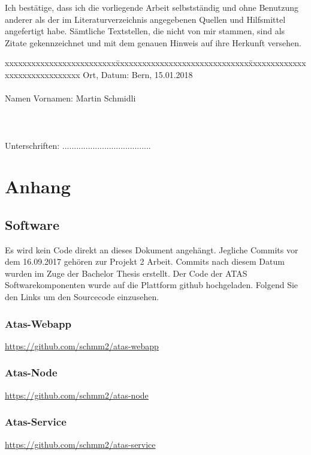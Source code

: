 \documentclass[11pt,english,german]{report}
\theoremstyle{definition}
\begin{document}
\vspace*{10mm} 

Ich bestätige, dass ich die vorliegende Arbeit selbstständig und ohne Benutzung anderer als der im Literaturverzeichnis angegebenen Quellen und Hilfsmittel angefertigt habe. Sämtliche Textstellen, die nicht von mir stammen, sind als Zitate gekennzeichnet und mit dem genauen Hinweis auf ihre Herkunft versehen. 

\vspace{15mm}

\begin{tabbing}
xxxxxxxxxxxxxxxxxxxxxxxxx\=xxxxxxxxxxxxxxxxxxxxxxxxxxxxxx\=xxxxxxxxxxxxxxxxxxxxxxxxxxxxxx\kill
Ort, Datum:\> Bern, 15.01.2018 \\ \\
Namen Vornamen:\> Martin Schmidli  \\ \\ \\ \\ 
Unterschriften:\> ...................................... \\
\end{tabbing}

\chapter*{Anhang}
\section{Software}
Es wird kein Code direkt an dieses Dokument angehängt. Jegliche Commits vor dem 16.09.2017 gehören zur Projekt 2 Arbeit. Commits nach diesem Datum wurden im Zuge der Bachelor Thesis erstellt. Der Code der ATAS Softwarekomponenten wurde auf die Plattform github hochgeladen. Folgend Sie den Links um den Sourcecode einzusehen.
\subsection{Atas-Webapp}
\url{https://github.com/schmm2/atas-webapp}
\subsection{Atas-Node}
\url{https://github.com/schmm2/atas-node}
\subsection{Atas-Service}
\url{https://github.com/schmm2/atas-service}


\printglossaries
\end{document}
